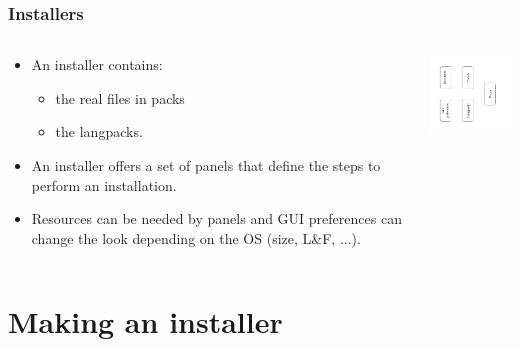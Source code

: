 \documentclass[compress,10pt]{beamer}
\begin{document}
\begin{frame}

\frametitle{Installers}

\begin{columns}

  \begin{column}{6.5cm}
  \begin{itemize}

    \item An installer contains:
      \begin{itemize}
        \item the real files in packs
        \item the langpacks.
      \end{itemize}

    \item An installer offers a set of panels that define the steps to perform
    an installation.

    \item Resources can be needed by panels and GUI preferences can change the
    look depending on the OS (size, L\&F, ...).

  \end{itemize}
  \end{column}

  \begin{column}{4cm}
  \includegraphics[width=4cm,angle=270]{installers-overview}
  \end{column}

\end{columns}

\end{frame}


\section{Making an installer}

\end{document}
